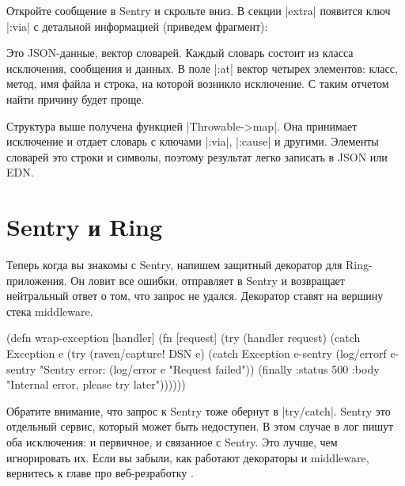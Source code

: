 Откройте сообщение в Sentry и скрольте вниз. В секции \spverb|extra| появится
ключ \spverb|:via| с детальной информацией (приведем фрагмент):

\begin{english}
  \begin{json}
  \end{json}
\end{english}

Это JSON-данные, вектор словарей. Каждый словарь состоит из класса исключения,
сообщения и данных. В поле \spverb|:at| вектор четырех элементов: класс, метод,
имя файла и строка, на которой возникло исключение. С таким отчетом найти
причину будет проще.

Структура выше получена функцией \spverb|Throwable->map|. Она принимает
исключение и отдает словарь с ключами \spverb|:via|, \spverb|:cause| и
другими. Элементы словарей это строки и символы, поэтому результат легко
записать в JSON или EDN.

\section{Sentry и Ring}

Теперь когда вы знакомы с Sentry, напишем защитный декоратор для
Ring-приложения. Он ловит все ошибки, отправляет в Sentry и возвращает
нейтральный ответ о том, что запрос не удался. Декоратор ставят на вершину стека
middleware.

\begin{english}
  \begin{clojure}
(defn wrap-exception
  [handler]
  (fn [request]
    (try
      (handler request)
      (catch Exception e
        (try
          (raven/capture! DSN e)
          (catch Exception e-sentry
            (log/errorf e-sentry "Sentry error: %
            (log/error e "Request failed"))
          (finally
            {:status 500
             :body "Internal error, please try later"}))))))
  \end{clojure}
\end{english}

Обратите внимание, что запрос к Sentry тоже обернут в \spverb|try/catch|. Sentry
это отдельный сервис, который может быть недоступен. В этом случае в лог пишут
оба исключения: и первичное, и связанное с Sentry. Это лучше, чем игнорировать
их. Если вы забыли, как работают декораторы и middleware, вернитесь к главе про
веб-резработку .

